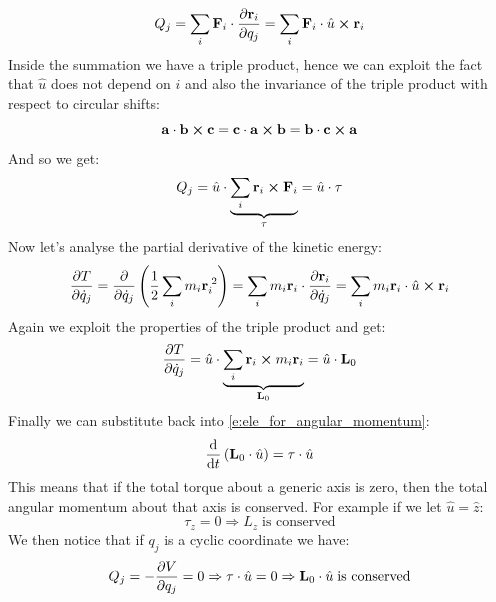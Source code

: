 \begin{equation}
    Q_j = \bigsum_i \vec{F}_i \cdot \pdv{\vec{r}_i}{q_j} = \bigsum_i \vec{F}_i \cdot \hat{u} \cross \vec{r}_i
\end{equation}
Inside the summation we have a triple product, hence we can exploit the fact that $\hat{u}$ does not depend on $i$ and also the invariance of the triple product with respect to circular shifts:
\begin{equation}
    \vb{a} \cdot \vb{b} \cross \vb{c} = \vb{c} \cdot \vb{a} \cross \vb{b} = \vb{b} \cdot \vb{c} \cross \vb{a}
\end{equation}
And so we get:
\begin{equation}
    Q_j = \hat{u} \cdot \underbrace{\displaystyle\sum_i \vb{r}_i \cross \vb{F}_i}_{\vb{\tau}} = \hat{u} \cdot \vb{\tau}
\end{equation}
Now let's analyse the partial derivative of the kinetic energy:
\begin{equation}
    \pdv{T}{\dot{q}_j} = \pdv{}{\dot{q}_j}\brackets{\dfrac{1}{2}\bigsum_i m_i \vec{r}_i^{\;2}} = \bigsum_i m_i \vec{r}_i \cdot \pdv{\vec{r}_i}{\dot{q}_j} = \bigsum_i m_i \vec{r}_i \cdot \hat{u} \cross \vec{r}_i
\end{equation}
Again we exploit the properties of the triple product and get:
\begin{equation}
    \pdv{T}{\dot{q}_j} =   \hat{u} \cdot \underbrace{\bigsum_i \vec{r}_i \cross m_i \vec{r}_i}_{\vec{L}_0} = \hat{u} \cdot \vec{L}_0
\end{equation}
Finally we can substitute back into \eqref{e:ele_for_angular_momentum}:
\begin{equation}
    \dv{}{t}\brackets{\vec{L}_0 \cdot \hat{u}} = \vec{\tau} \cdot \hat{u}
\end{equation}
This means that if the total torque about a generic axis is zero, then the total angular momentum about that axis is conserved. For example if we let $\hat{u} = \hat{z}$:
\begin{equation}
    \tau_z = 0 \Rightarrow L_z\;\text{is conserved}
\end{equation}
We then notice that if $q_j$ is a cyclic coordinate we have:
\begin{equation}
    Q_j = -\pdv{V}{q_j} = 0 \Rightarrow \vec{\tau} \cdot \hat{u} = 0 \Rightarrow \vec{L}_0 \cdot \hat{u}\;\text{is conserved}
\end{equation}
